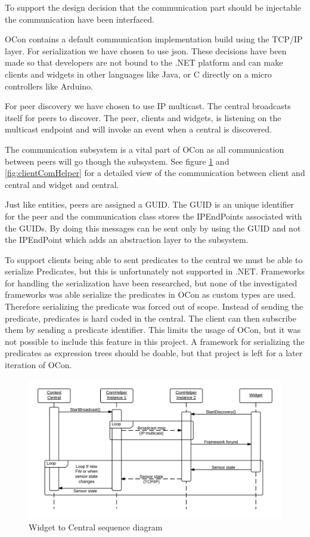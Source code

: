 \documentclass[../report.tex]{subfiles}
\begin{document}
To support the design decision that the communication part should be injectable the communication have been interfaced.

OCon contains a default communication implementation build using the TCP/IP layer. For serialization we have chosen to use json. These decisions have been made so that developers are not bound to the .NET platform and can make clients and widgets in other languages like Java, or C directly on a micro controllers like Arduino.

For peer discovery we have chosen to use IP multicast. The central broadcasts itself for peers to discover. The peer, clients and widgets, is listening on the multicast endpoint and will invoke an event when a central is discovered.

The communication subsystem is a vital part of OCon as all communication between peers will go though the subsystem. See figure \ref{fig:widgetComHelper} and \ref{fig:clientComHelper} for a detailed view of the communication between client and central and widget and central.

Just like entities, peers are assigned a GUID. The GUID is an unique identifier for the peer and the communication class stores the IPEndPoints associated with the GUIDs. By doing this messages can be sent only by using the GUID and not the IPEndPoint which adds an abstraction layer to the subsystem.

To support clients being able to sent predicates to the central we must be able to serialize Predicates, but this is unfortunately not supported in .NET. Frameworks for handling the serialization have been researched, but none of the investigated frameworks was able serialize the predicates in OCon as custom types are used. Therefore serializing the predicate was forced out of scope. Instead of sending the predicate, predicates is hard coded in the central. The client can then subscribe them by sending a predicate identifier. This limits the usage of OCon, but it was not possible to include this feature in this project. A framework for serializing the predicates as expression trees should be doable, but that project is left for a later iteration of OCon.

\begin{figure}[h]
\centering
\includegraphics[width=\linewidth]{comHelperSequence-widget.png}
\caption{Widget to Central sequence diagram}
\label{fig:widgetComHelper}
\end{figure}
\end{document}
